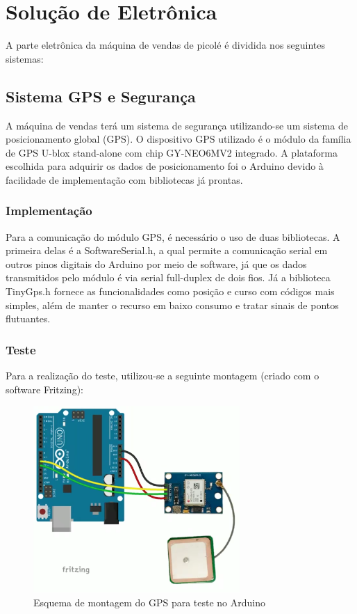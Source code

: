 \section{Solução de Eletrônica}

A parte eletrônica da máquina de vendas de picolé é dividida nos seguintes sistemas:

\subsection{Sistema GPS e Segurança}

A máquina de vendas terá um sistema de segurança utilizando-se um sistema de posicionamento global (GPS). O dispositivo GPS utilizado é o módulo da família de GPS U-blox stand-alone com chip GY-NEO6MV2 integrado. A plataforma escolhida para adquirir os dados de posicionamento foi o Arduino devido à facilidade de implementação com bibliotecas já prontas. 

\subsubsection{Implementação}

Para a comunicação do módulo GPS, é necessário o uso de duas bibliotecas. A primeira delas é a SoftwareSerial.h, a qual permite a comunicação serial em outros pinos digitais do Arduino por meio de software, já que os dados transmitidos pelo módulo é via serial full-duplex de dois fios. Já a biblioteca TinyGps.h fornece as funcionalidades como posição e curso com códigos mais simples, além de manter o recurso em baixo consumo e tratar sinais de pontos flutuantes.

\subsubsection{Teste}
Para a realização do teste, utilizou-se a seguinte montagem (criado com o software Fritzing):

\begin{figure}[H]
	\centering
    \includegraphics[width=0.7\textwidth]{figuras/fritzing_arduino}
    \caption{Esquema de montagem do GPS para teste no Arduino}
    \label{fig:fritzing_arduino}
\end{figure}

